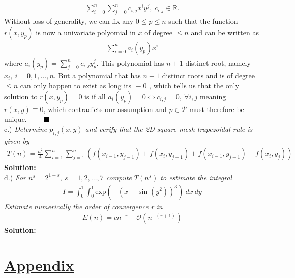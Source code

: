 \documentclass[12pt,
               a4paper,
               article,
               oneside,
               english,oldfontcommands]{memoir}
\newcommand{\Q}{ \qquad \hfill \blacksquare}
\newcommand{\spaze}{\vspace{4mm}\\}
\begin{document}
\begin{align*}
\sum_{i=0}^{n}\sum_{j=0}^{n} c_{i,j}x^{i}y^{j}, \ c_{i,j} \in \mathbb{R}.
\end{align*}
Without loss of generality, we can fix any $ 0 \leq p \leq n$ such that the function $r(x, y_p)$ is now a univariate polyomial in $x$ of degree $\leq n$ and can be written as
\begin{align*}
\sum_{i=0}^{n} a_{i}(y_p)x^{i}
\end{align*} 
where $  a_{i}(y_p) = \sum_{j=0}^{n} c_{i,j} y_{p}^{j}$.  This polynomial has $n+1$ distinct root, namely $x_i, \ i=0, 1, \ldots, n$. But a polynomial that has $n+1$ distinct roots and is of degree $\leq n$ can only happen to exist as long its $\equiv 0$ , which tells us that the only solution to $r(x, y_p) = 0 $ is if all $a_{i}(y_p) = 0 \iff c_{i,j} =0, \ \forall i,j$ meaning $r(x,y) \equiv 0$, which contradicts our assumption and $p \in \mathcal{P}$ must therefore be unique. $\Q$\spaze
c.) \emph{Determine $p_{i,j}(x,y)$ and verify that the 2D square-mesh trapezoidal rule is given by}
\begin{align*}
T(n) = \frac{h^2}{4}\sum_{i=1}^{n}\sum_{j=1}^{n} \left( f(x_{i-1}, y_{j-1}) + f(x_i, y_{j-1}) +  f(x_{i-1}, y_{j-1}) +  f(x_i, y_{j}) \right)
\end{align*}
\textbf{Solution:} \spaze
d.) \emph{ For $n^s = 2^{1+s}, \ s = 1,2, \ldots, 7$ compute $T(n^s)$ to estimate the integral}
\begin{align*}
I = \int_{0}^{1} \int_{0}^{1} \text{exp}(-(x - \sin(y^2))^3) \ dx \ dy
\end{align*}
\emph{Estimate numerically the order of convergence r in}
\begin{align*}
E(n) = cn^{-r} + \mathcal{O}(n^{-(r+1)})
\end{align*}
\textbf{Solution:} \spaze
\section*{\centering \underline{Appendix}}
\end{document}
